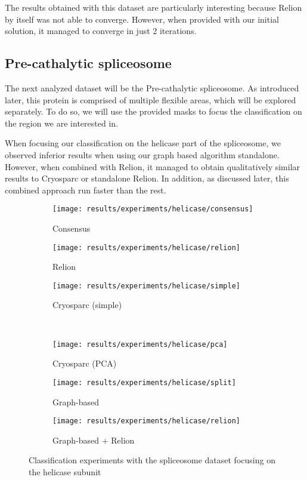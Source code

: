\documentclass[../main.tex]{subfiles}
\begin{document}
The results obtained with this dataset are particularly interesting because Relion by itself was not able to converge. However, when provided with our initial solution, it managed to converge in just 2 iterations.

\subsection{Pre-cathalytic spliceosome}
The next analyzed dataset will be the Pre-cathalytic spliceosome. As introduced later, this protein is comprised of multiple flexible areas, which will be explored separately. To do so, we will use the provided masks to focus the classification on the region we are interested in.

When focusing our classification on the helicase part of the spliceosome, we observed inferior results when using our graph based algorithm standalone. However, when combined with Relion, it managed to obtain qualitatively similar results to Cryosparc or standalone Relion. In addition, as discussed later, this combined approach run faster than the rest. 

\begin{figure}[hbp]
    \centering
    \begin{subfigure}[b]{0.3\textwidth}
         \centering
         \texttt{[image: results/experiments/helicase/consensus]}
         \caption{Consensus}
    \end{subfigure}
    \begin{subfigure}[b]{0.3\textwidth}
         \centering
         \texttt{[image: results/experiments/helicase/relion]}
         \caption{Relion}
    \end{subfigure}
    \begin{subfigure}[b]{0.3\textwidth}
         \centering
         \texttt{[image: results/experiments/helicase/simple]}
         \caption{Cryosparc (simple)}
    \end{subfigure}\\
    \vspace{1em}
    \begin{subfigure}[b]{0.3\textwidth}
         \centering
         \texttt{[image: results/experiments/helicase/pca]}
         \caption{Cryosparc (PCA)}
    \end{subfigure}
    \begin{subfigure}[b]{0.3\textwidth}
         \centering
         \texttt{[image: results/experiments/helicase/split]}
         \caption{Graph-based}
    \end{subfigure}
    \begin{subfigure}[b]{0.3\textwidth}
         \centering
         \texttt{[image: results/experiments/helicase/relion]}
         \caption{Graph-based + Relion}
    \end{subfigure}
    \caption{Classification experiments with the spliceosome dataset focusing on the helicase subunit}
    \label{fig:5.2:helicase_slices}
\end{figure}
\end{document}
